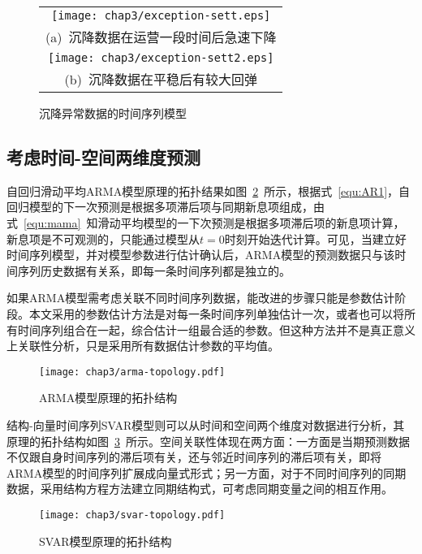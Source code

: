 \begin{figure}[htbp] 
    \centering 
    \begin{tabular}{c} 
        \texttt{[image: chap3/exception-sett.eps]} \\ 
        (a)~沉降数据在运营一段时间后急速下降 \\
        \texttt{[image: chap3/exception-sett2.eps]} \\ 
        (b)~沉降数据在平稳后有较大回弹 \\
    \end{tabular}
    \caption{沉降异常数据的时间序列模型} 
    \label{fig:沉降异常数据的时间序列模型} 
\end{figure}

\subsection{考虑时间-空间两维度预测}

自回归滑动平均ARMA模型原理的拓扑结果如图~\ref{fig:ARMA模型原理的拓扑结构}~所示，根据式~\ref{equ:AR1}，自回归模型的下一次预测是根据多项滞后项与同期新息项组成，由式~\ref{equ:mama}~知滑动平均模型的一下次预测是根据多项滞后项的新息项计算，新息项是不可观测的，只能通过模型从$t=0$时刻开始迭代计算。可见，当建立好时间序列模型，并对模型参数进行估计确认后，ARMA模型的预测数据只与该时间序列历史数据有关系，即每一条时间序列都是独立的。

如果ARMA模型需考虑关联不同时间序列数据，能改进的步骤只能是参数估计阶段。本文采用的参数估计方法是对每一条时间序列单独估计一次，或者也可以将所有时间序列组合在一起，综合估计一组最合适的参数。但这种方法并不是真正意义上关联性分析，只是采用所有数据估计参数的平均值。

\begin{figure}[htb!]
    \centering
    \texttt{[image: chap3/arma-topology.pdf]}
    \caption{ARMA模型原理的拓扑结构}
    \label{fig:ARMA模型原理的拓扑结构}
\end{figure}

结构-向量时间序列SVAR模型则可以从时间和空间两个维度对数据进行分析，其原理的拓扑结构如图~\ref{fig:SVAR模型原理的拓扑结构}~所示。空间关联性体现在两方面：一方面是当期预测数据不仅跟自身时间序列的滞后项有关，还与邻近时间序列的滞后项有关，即将ARMA模型的时间序列扩展成向量式形式；另一方面，对于不同时间序列的同期数据，采用结构方程方法建立同期结构式，可考虑同期变量之间的相互作用。

\begin{figure}[htb!]
    \centering
    \texttt{[image: chap3/svar-topology.pdf]}
    \caption{SVAR模型原理的拓扑结构}
    \label{fig:SVAR模型原理的拓扑结构}
\end{figure}

